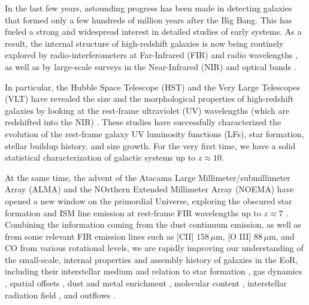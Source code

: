 \documentclass[a4paper, 12pt]{article}
\begin{document}
In the last few years, astounding progress has been made in detecting galaxies that formed only a few hundreds of million years after the Big Bang. This has fueled a strong and widespread interest in detailed studies of early systems. As a result, the internal structure of high-redshift galaxies is now being routinely explored by radio-interferometers at Far-Infrared (FIR) and radio wavelengths \citep{Fevre:2019thf, capak2015, decarli2016alma}, as well as by large-scale surveys in the Near-Infrared (NIR) and optical bands \citep{refId0, Madau:1996yh}. 

In particular, the Hubble Space Telescope (HST) and the Very Large Telescopes (VLT) have revealed the size and the morphological properties of high-redshift galaxies by looking at the rest-frame ultraviolet (UV) wavelengths (which are redshifted into the NIR) \citep{oesch2009structure,Shibuya:2015qfa, bouwens2017z, kawamata2018size}. These studies have successfully characterized the evolution of the rest-frame galaxy UV luminosity functions (LFs), star formation, stellar buildup history, and size growth. For the very first time, we have a solid statistical characterization of galactic systems up to $z\approx 10$. 

At the same time, the advent of the Atacama Large Millimeter/submillimeter Array (ALMA) and the NOrthern Extended Millimeter Array (NOEMA) have opened a new window on the primordial Universe, exploring the obscured star formation and ISM line emission at rest-frame FIR wavelengths up to $z\approx7$ \citep{maiolino2015,pentericci2016, matthee2017, Hashimoto2018}. Combining the information coming from the dust continuum emission, as well as from some relevant FIR emission lines such as [CII] $158 \,\mu\mathrm{m}$, [O III] $88 \,\mu\mathrm{m}$, and CO from various rotational levels, we are rapidly improving our understanding of the small-scale, internal properties and assembly history of galaxies in the EoR, including their interstellar medium and relation to star formation \citep{capak2015, carniani2017}, gas dynamics \citep{smit:2018}, spatial offsets \citep{inoue2016, Laporte17, carniani2018}, dust and metal enrichment \citep{capak2015, Knudsen:2017, Laporte17, Tamura:2019}, molecular content \citep{dodorico:2018}, interstellar radiation field \citep{Stark15}, and outflows \citep{gallerani:2018, Fujimoto19, ginolfi:2019, herrera2021kiloparsec}.
\end{document}
